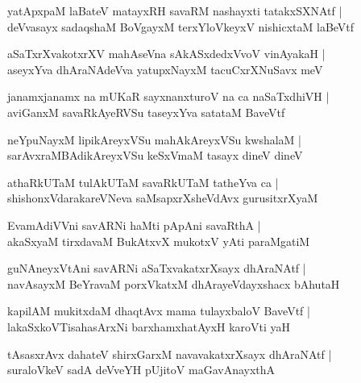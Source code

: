 \documentclass[twoside,12pt,openright]{book}
\newcounter{shloka}[chapter]
\begin{document}
\begin{shloka}%
yatApxpaM laBateV matayxRH savaRM nashayxti tatakxSXNAtf |\\
deVvasayx sadaqshaM BoVgayxM terxYloVkeyxV nishicxtaM laBeVtf
\end{shloka}

\begin{shloka}%
aSaTxrXvakotxrXV mahAseVna sAkASxdedxVvoV vinAyakaH |\\
aseyxYva dhAraNAdeVva yatupxNayxM tacuCxrXNuSavx meV 
\end{shloka}

\begin{shloka}%
janamxjanamx na mUKaR sayxnanxturoV na ca naSaTxdhiVH |\\
aviGanxM savaRkAyeRVSu taseyxYva satataM BaveVtf
\end{shloka}

\begin{shloka}%
neYpuNayxM lipikAreyxVSu mahAkAreyxVSu kwshalaM |\\
sarAvxraMBAdikAreyxVSu keSxVmaM tasayx dineV dineV 
\end{shloka}

\begin{shloka}%
athaRkUTaM tulAkUTaM savaRkUTaM tatheYva ca |\\
shishonxVdarakareVNeva saMsapxrXsheVdAvx gurusitxrXyaM 
\end{shloka}

\begin{shloka}%
EvamAdiVVni savARNi haMti pApAni savaRthA |\\
akaSxyaM tirxdavaM BukAtxvX mukotxV yAti paraMgatiM 
\end{shloka}

\begin{shloka}%
guNAneyxVtAni savARNi aSaTxvakatxrXsayx dhAraNAtf |\\
navAsayxM BeYravaM porxVkatxM dhArayeVdayxshacx bAhutaH 
\end{shloka}

\begin{shloka}%
kapilAM mukitxdaM dhaqtAvx mama tulayxbaloV BaveVtf |\\
lakaSxkoVTisahasArxNi barxhamxhatAyxH karoVti yaH 
\end{shloka}

\begin{shloka}%
tAsasxrAvx dahateV shirxGarxM navavakatxrXsayx dhAraNAtf |\\
suraloVkeV sadA deVveYH pUjitoV maGavAnayxthA
\end{shloka}
\end{document}
